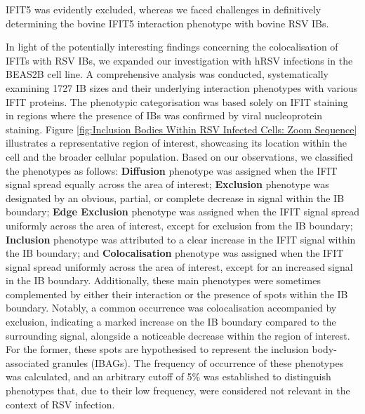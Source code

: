 IFIT5 was evidently excluded, whereas we faced challenges in definitively determining the bovine IFIT5 interaction phenotype with bovine RSV IBs.

In light of the potentially interesting findings concerning the colocalisation of IFITs with RSV IBs, we expanded our investigation with hRSV infections in the BEAS2B cell line. A comprehensive analysis was conducted, systematically examining 1727 IB sizes and their underlying interaction phenotypes with various IFIT proteins. The phenotypic categorisation was based solely on IFIT staining in regions where the presence of IBs was confirmed by viral nucleoprotein staining. Figure \ref{fig:Inclusion Bodies Within RSV Infected Cells: Zoom Sequence} illustrates a representative region of interest, showcasing its location within the cell and the broader cellular population. Based on our observations, we classified the phenotypes as follows: \textbf{Diffusion} phenotype was assigned when the IFIT signal spread equally across the area of interest; \textbf{Exclusion} phenotype was designated by an obvious, partial, or complete decrease in signal within the IB boundary; \textbf{Edge Exclusion} phenotype was assigned when the IFIT signal spread uniformly across the area of interest, except for exclusion from the IB boundary; \textbf{Inclusion} phenotype was attributed to a clear increase in the IFIT signal within the IB boundary; and \textbf{Colocalisation} phenotype was assigned when the IFIT signal spread uniformly across the area of interest, except for an increased signal in the IB boundary. Additionally, these main phenotypes were sometimes complemented by either their interaction or the presence of spots within the IB boundary. Notably, a common occurrence was colocalisation accompanied by exclusion, indicating a marked increase on the IB boundary compared to the surrounding signal, alongside a noticeable decrease within the region of interest. For the former, these spots are hypothesised to represent the inclusion body-associated granules (IBAGs). The frequency of occurrence of these phenotypes was calculated, and an arbitrary cutoff of 5\% was established to distinguish phenotypes that, due to their low frequency, were considered not relevant in the context of RSV infection.

